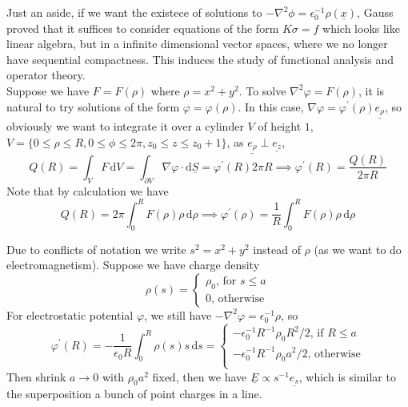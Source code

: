 Just an aside, if we want the existece of solutions to $-\nabla^2\phi=\epsilon_0^{-1}\rho(\underline{x})$, Gauss proved that it suffices to consider equations of the form $K\sigma=f$ which looks like linear algebra, but in a infinite dimensional vector spaces, where we no longer have sequential compactness.
This induces the study of functional analysis and operator theory.\\
Suppose we have $F=F(\rho)$ where $\rho=x^2+y^2$.
To solve $\nabla^2\varphi=F(\rho)$, it is natural to try solutions of the form $\varphi=\varphi(\rho)$.
In this case, $\nabla\varphi=\varphi^\prime(\rho)\underline{e_\rho}$, so obviously we want to integrate it over a cylinder $V$ of height $1$, $V=\{0\le\rho\le R,0\le\phi\le 2\pi,z_0\le z\le z_0+1\}$, as $\underline{e_\rho}\perp\underline{e_z}$,
$$Q(R)=\int_VF\,\mathrm dV=\int_{\partial V}\nabla\varphi\cdot\mathrm d\underline{S}=\varphi^\prime(R)2\pi R\implies\varphi^\prime(R)=\frac{Q(R)}{2\pi R}$$
Note that by calculation we have
$$Q(R)=2\pi\int_0^RF(\rho)\rho\,\mathrm d\rho\implies\varphi^\prime(\rho)=\frac{1}{R}\int_0^RF(\rho)\rho\,\mathrm d\rho$$
\begin{example}
    Due to conflicts of notation we write $s^2=x^2+y^2$ instead of $\rho$ (as we want to do electromagnetism).
    Suppose we have charge density
    $$\rho(s)=\begin{cases}
        \rho_0\text{, for $s\le a$}\\
        0\text{, otherwise}
    \end{cases}$$
    For electrostatic potential $\varphi$, we still have $-\nabla^2\varphi=\epsilon_0^{-1}\rho$, so
    $$\varphi^\prime(R)=-\frac{1}{\epsilon_0R}\int_0^R\rho(s)s\,\mathrm ds=\begin{cases}
        -\epsilon_0^{-1}R^{-1}\rho_0R^2/2\text{, if $R\le a$}\\
        -\epsilon_0^{-1}R^{-1}\rho_0a^2/2\text{, otherwise}\\
    \end{cases}$$
    Then shrink $a\to 0$ with $\rho_0a^2$ fixed, then we have $\underline{E}\propto s^{-1}\underline{e_s}$, which is similar to the superposition a bunch of point charges in a line.
\end{example}
